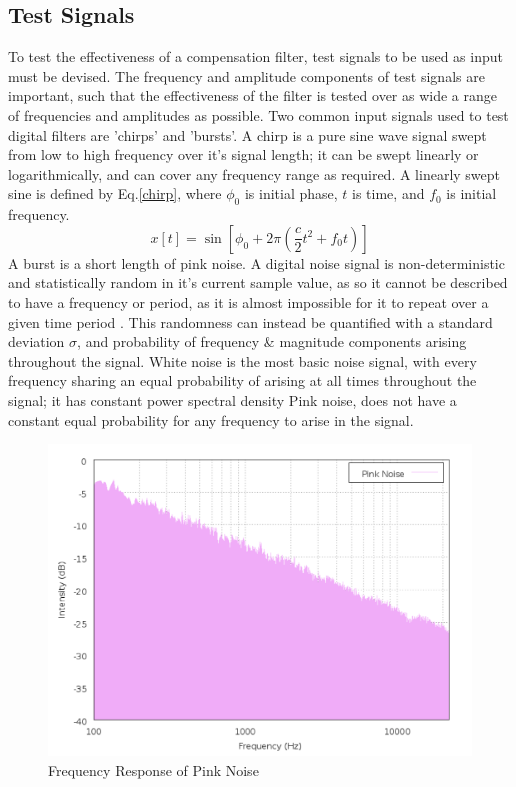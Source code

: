 \documentclass[conference]{IEEEtran}
\begin{document}
    \subsection{Test Signals}
        To test the effectiveness of a compensation filter, test signals to be used as input must be devised.
        The frequency and amplitude components of test signals are important, such that the effectiveness of the filter is tested over as wide a range of frequencies and amplitudes as possible.
        Two common input signals used to test digital filters are 'chirps' and 'bursts'.
        A chirp is a pure sine wave signal swept from low to high frequency over it's signal length; it can be swept linearly or logarithmically, and can cover any frequency range as required.
        A linearly swept sine is defined by Eq.\ref{chirp}, where $\phi_0$ is initial phase, $t$ is time, and $f_0$ is initial frequency.
        \begin{equation}\label{chirp}
            x[t] = \sin{[\phi_0 + 2\pi(\frac{c}{2} t^2 + f_0 t)]}
        \end{equation}
        A burst is a short length of pink noise.
        A digital noise signal is non-deterministic and statistically random in it's current sample value, as so it cannot be described to have a frequency or period, as it is almost impossible for it to repeat over a given time period \cite{OPPENHEIM376}.
        This randomness can instead be quantified with a standard deviation $\sigma$, and probability of frequency \& magnitude components arising throughout the signal.
        White noise is the most basic noise signal, with every frequency sharing an equal probability of arising at all times throughout the signal; it has constant power spectral density \cite{CARTER}
        Pink noise, does not have a constant equal probability for any frequency to arise in the signal.
        \begin{figure}[H]
            \centering
            \includegraphics[scale = 0.35]{resources/PinkNoise.png}
            \caption{Frequency Response of Pink Noise \cite{AFIELDS}}
        \end{figure}
\end{document}
